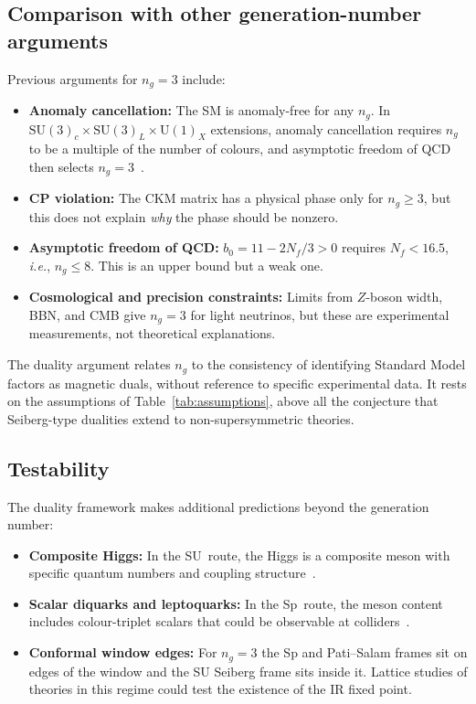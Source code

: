 \documentclass[11pt,a4paper]{article}
\theoremstyle{plain}
\theoremstyle{definition}
\theoremstyle{remark}
\newcommand{\Nf}{N_{\!f}}
\newcommand{\ngen}{n_g}
\newcommand{\SU}[1]{\mathrm{SU}(#1)}
\newcommand{\UU}[1]{\mathrm{U}(#1)}
\newcommand{\ie}{\textit{i.e.}}
\begin{document}
\subsection{Comparison with other generation-number arguments}

Previous arguments for $\ngen = 3$ include:
\begin{itemize}
  \item \textbf{Anomaly cancellation:} The SM is anomaly-free for any
    $\ngen$.  In $\SU{3}_c \times \SU{3}_L \times \UU{1}_X$ extensions,
    anomaly cancellation requires $\ngen$ to be a multiple of the number
    of colours, and asymptotic freedom of QCD then selects
    $\ngen = 3$~\cite{Frampton1992}.
  \item \textbf{CP violation:} The CKM matrix has a physical phase only
    for $\ngen \geq 3$, but this does not explain \emph{why} the phase
    should be nonzero.
  \item \textbf{Asymptotic freedom of QCD:} $b_0 = 11 - 2\Nf/3 > 0$
    requires $\Nf < 16.5$, \ie, $\ngen \leq 8$.  This is an upper bound
    but a weak one.
  \item \textbf{Cosmological and precision constraints:}
    Limits from $Z$-boson width, BBN, and CMB give $\ngen = 3$ for
    light neutrinos, but these are experimental measurements, not
    theoretical explanations.
\end{itemize}

The duality argument relates $\ngen$ to the consistency of identifying
Standard Model factors as magnetic duals, without reference to specific
experimental data.  It rests on the assumptions of
Table~\ref{tab:assumptions}, above all the conjecture that Seiberg-type
dualities extend to non-supersymmetric theories.

\subsection{Testability}

The duality framework makes additional predictions beyond the generation
number:
\begin{itemize}
  \item \textbf{Composite Higgs:} In the SU~route, the Higgs is a
    composite meson with specific quantum numbers and coupling
    structure~\cite{CacciapagliaSannino2024}.
  \item \textbf{Scalar diquarks and leptoquarks:} In the Sp~route, the
    meson content includes colour-triplet scalars that could be
    observable at colliders~\cite{Paper1}.
  \item \textbf{Conformal window edges:} For $\ngen = 3$ the Sp and
    Pati--Salam frames sit on edges of the window and the SU Seiberg
    frame sits inside it.  Lattice studies of theories in this regime
    could test the existence of the IR fixed point.
\end{itemize}
\end{document}
